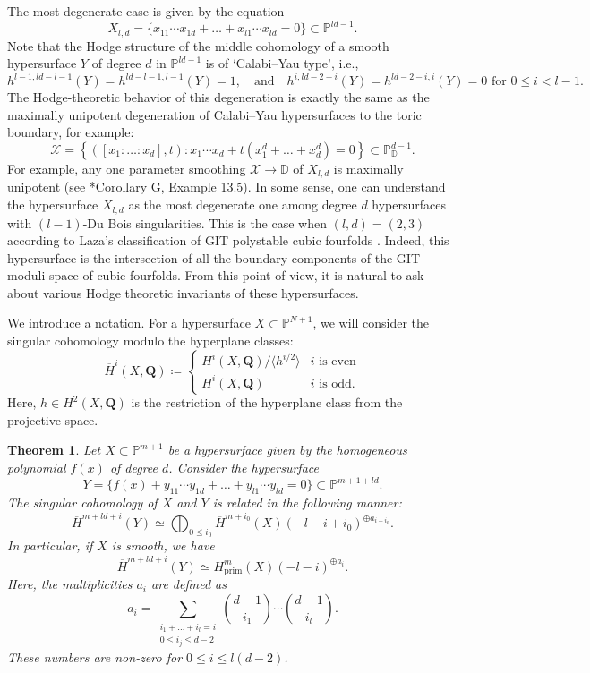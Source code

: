 \documentclass[letterpaper,11pt]{amsart}
\theoremstyle{plain}
\newtheorem{theo}{Theorem}[section]
\theoremstyle{definition}
\theoremstyle{remark}
\newcommand{\PP}{\mathbb{P}}
\newcommand{\QQ}{\mathbf{Q}}
\newcommand{\DD}{\mathbb{D}}
\newcommand{\cX}{\mathcal{X}}
\DeclareMathOperator{\prim}{prim}
\begin{document}
    The most degenerate case is given by the equation
    \begin{equation} \label{eqn:X_ld}
        X_{l,d} = \{ x_{11}\cdots x_{1d} + \ldots + x_{l1} \cdots x_{ld} = 0 \} \subset \PP^{ld-1}.
    \end{equation}
    Note that the Hodge structure of the middle cohomology of a smooth hypersurface $Y$ of degree $d$ in $\PP^{ld-1}$ is of `Calabi--Yau type', i.e., 
    $$ h^{l-1, ld-l-1}(Y) = h^{ld-l-1,l-1}(Y) = 1, \quad \text{and}\quad h^{i, ld-2-i}(Y) = h^{ld-2-i,i}(Y) = 0 \text{ for } 0 \leq i < l-1.$$
    The Hodge-theoretic behavior of this degeneration is exactly the same as the maximally unipotent degeneration of Calabi--Yau hypersurfaces to the toric boundary, for example:
    $$ \cX = \left\{ ([x_1:\ldots :x_d], t) : x_{1}\cdots x_{d} + t (x_{1}^{d} + \ldots + x_{d}^{d}) = 0 \right\} \subset \PP_{\DD}^{d-1}.$$
    For example, any one parameter smoothing $\cX \to \DD$ of $X_{l,d}$ is maximally unipotent (see \cite{park2025git}*{Corollary G, Example 13.5}). In some sense, one can understand the hypersurface $X_{l,d}$ as the most degenerate one among degree $d$ hypersurfaces with $(l-1)$-Du Bois singularities. This is the case when $(l,d) = (2,3)$ according to Laza's classification of GIT polystable cubic fourfolds \cite{Laza-fourfold,Laza:4-fold-period}. Indeed, this hypersurface is the intersection of all the boundary components of the GIT moduli space of cubic fourfolds. From this point of view, it is natural to ask about various Hodge theoretic invariants of these hypersurfaces.

    We introduce a notation. For a hypersurface $X \subset \PP^{N+1}$, we will consider the singular cohomology modulo the hyperplane classes:
    $$ \overline{H}^{i}(X, \QQ) \coloneqq \begin{cases} H^{i}(X, \QQ)/ \langle h^{i/2} \rangle & i \text{ is even}\\H^{i}(X, \QQ) & i \text{ is odd}.
    \end{cases}$$
    Here, $h \in H^{2}(X, \QQ)$ is the restriction of the hyperplane class from the projective space. 

    \begin{theo} \label{theo:appending-snc}
        Let $X \subset \PP^{m+1}$ be a hypersurface given by the homogeneous polynomial $f(x)$ of degree $d$. Consider the hypersurface
        $$ Y = \{ f(x) + y_{11} \cdots y_{1d} + \ldots + y_{l1}\cdots y_{ld} = 0\} \subset \PP^{m+ 1+ld}.$$
        The singular cohomology of $X$ and $Y$ is related in the following manner:
        $$ \overline{H}^{m+ld+ i}(Y) \simeq \bigoplus_{0 \leq i_{0}} \overline{H}^{m + i_{0}}(X) (-l-i+i_{0})^{\oplus a_{i-i_{0}}}.$$
        In particular, if $X$ is smooth, we have
        $$ \overline{H}^{m+ld + i}(Y) \simeq H^{m}_{\prim}(X)(-l-i)^{\oplus a_{i}}.$$
        Here, the multiplicities $a_{i}$ are defined as
        $$ a_{i} = \sum_{\substack{i_{1}+ \ldots + i_{l} = i \\ 0 \leq i_{j} \leq d-2}} {d - 1 \choose i_{1}}\cdots {d - 1 \choose i_{l}}.$$
        These numbers are non-zero for $0 \leq i \leq l(d-2)$.
    \end{theo}
\end{document}
